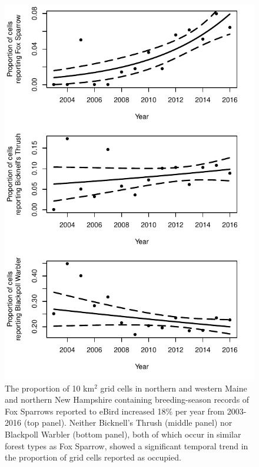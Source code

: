 \documentclass[fleqn,10pt,lineno]{wlpeerj} %
\begin{document}
\begin{figure}[ht]\centering
\includegraphics[width=\linewidth]{Figure2}
\caption{The proportion of 10 km$^{2}$ grid cells in northern and western Maine and northern New Hampshire containing breeding-season records of Fox Sparrows reported to eBird increased 18\% per year from 2003-2016 (top panel). Neither Bicknell’s Thrush (middle panel) nor Blackpoll Warbler (bottom panel), both of which occur in similar forest types as Fox Sparrow, showed a significant temporal trend in the proportion of grid cells reported as occupied.}
\label{fig:Figure2}
\end{figure}
\end{document}
